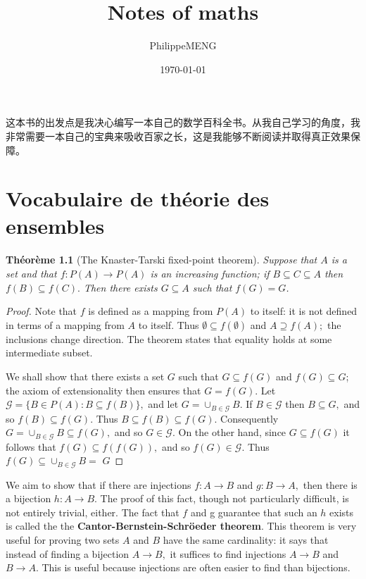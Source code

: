 \documentclass[12pt]{book}
\title{Notes of maths}
\author{PhilippeMENG}
\date{\today}
\theoremstyle{definition}\newtheorem{dfn}{Définition}[chapter]
\theoremstyle{plain}\newtheorem{thm}{Théorème}[chapter]
\theoremstyle{plain}\newtheorem{prp}{Proposition}[chapter]
\theoremstyle{plain}\newtheorem{lem}{\bf Lemme}[chapter]
\theoremstyle{plain}\newtheorem{axm}{\bf Axiome}[chapter]
\theoremstyle{plain}\newtheorem{lmm}{\bf Lemme}[chapter]
\theoremstyle{plain}\newtheorem{exm}{\bf Example}[chapter]
\theoremstyle{plain}\newtheorem{cor}{\bf Corollaire}[chapter]
\theoremstyle{remark}\newtheorem{rem}{Remarque}[chapter]
\begin{document}
\maketitle
\tableofcontents
\frontmatter
这本书的出发点是我决心编写一本自己的数学百科全书。从我自己学习的角度，我非常需要一本自己的宝典来吸收百家之长，这是我能够不断阅读并取得真正效果保障。
\mainmatter

        \chapter{Vocabulaire de théorie des ensembles}

\begin{thm}[The Knaster-Tarski fixed-point theorem]
 Suppose that $A$ is a set and that $f: P(A) \rightarrow P(A)$ is an increasing function; if $B \subseteq C \subseteq A$ then $f(B) \subseteq f(C) .$ Then there exists $G \subseteq A$ such that $f(G)=G$.
\end{thm}

\begin{proof}
	Note that $f$ is defined as a mapping from $P(A)$ to itself: it is not defined in terms of a mapping from $A$ to itself. Thus $\emptyset \subseteq f(\emptyset)$ and $A \supseteq f(A) ;$ the inclusions change direction. The theorem states that equality holds at some intermediate subset.
	
	We shall show that there exists a set $G$ such that $G \subseteq f(G)$ and $f(G) \subseteq G$; the axiom of extensionality then ensures that $G=f(G)$. Let $\mathcal{G}=\{B \in P(A): B \subseteq f(B)\},$ and let $G=\cup_{B \in \mathcal{G}} B .$ If $B \in \mathcal{G}$
	then $B \subseteq G,$ and so $f(B) \subseteq f(G) .$ Thus $B \subseteq f(B) \subseteq f(G) .$ Consequently $G=\cup_{B \in \mathcal{G}} B \subseteq f(G),$ and so $G \in \mathcal{G} .$ On the other hand, since $G \subseteq f(G)$
	it follows that $f(G) \subseteq f(f(G)),$ and so $f(G) \in \mathcal{G} .$ Thus $f(G) \subseteq \cup_{B \in \mathcal{G}} B=$
	$G$

\end{proof}









We aim to show that if there are injections $f: A \rightarrow B$ and
$g: B \rightarrow A,$ then there is a bijection $h: A \rightarrow B .$
The proof of this fact, though not particularly difficult, is not
entirely trivial, either. The fact that $f$ and g guarantee that such
an $h$ exists is called the the {\bf Cantor-Bernstein-Schröeder theorem}. This theorem is very useful for proving two sets $A$ and $B$ have the same cardinality: it says that instead of finding a bijection $A \rightarrow B,$ it suffices to find injections $A \rightarrow B$ and $B \rightarrow A$. This is useful because injections are often easier to find than bijections.
\end{document}
